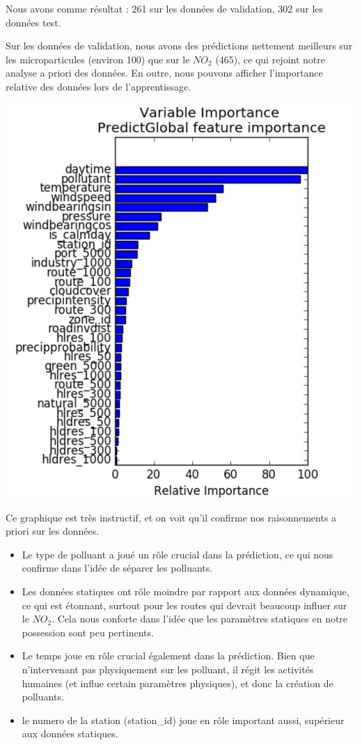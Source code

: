 Nous avons comme résultat : 261 sur les données de validation, 302 sur les données test.

Sur les données de validation, nous avons des prédictions nettement meilleurs sur les microparticules (environ 100) que sur le $NO_2$ (465), ce qui rejoint notre analyse a priori des données. En outre, nous pouvons afficher l'importance relative des données lors de l'apprentissage.

\begin{center}
	\includegraphics{images/importance feature global.png}
\end{center}

Ce graphique est très instructif, et on voit qu'il confirme nos raisonnements a priori sur les données. 
\begin{itemize}
	\item Le type de polluant a joué un rôle crucial dans la prédiction, ce qui nous confirme dans l'idée de séparer les polluants.
	\item Les données statiques ont rôle moindre par rapport aux données dynamique, ce qui est étonnant, surtout pour les routes qui devrait beaucoup influer sur le $NO_2$. Cela nous conforte dans l'idée que les paramètres statiques en notre possession sont peu pertinents.
	\item Le temps joue en rôle crucial également dans la prédiction. Bien que n'intervenant pas physiquement sur les polluant, il régit les activités humaines (et influe certain paramètres physiques), et donc la création de polluants.
	\item le numero de la station (station_id) joue en rôle important aussi, supérieur aux données statiques. %
\end{itemize} 


